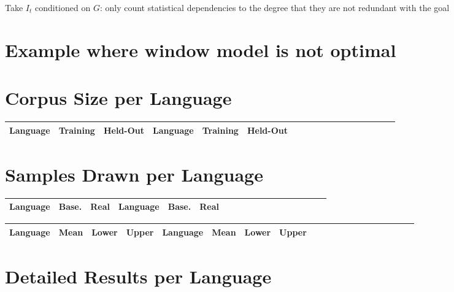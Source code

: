 \documentclass[11pt,letterpaper]{article}
\begin{document}
Take $I_t$ conditioned on $G$: only count statistical dependencies to the degree that they are not redundant with the goal


\section{Example where window model is not optimal}



\section{Corpus Size per Language}

\begin{center}
\begin{longtable}{l|ll||l|llllllllllllll}
	Language & Training & Held-Out & 	Language & Training & Held-Out\\ \hline

\end{longtable}
	\label{tab:corpora}
\end{center}

\section{Samples Drawn per Language}

\begin{center}
\begin{longtable}{l|ll||l|llllllllllllll}
	Language & Base. & Real & Language & Base. & Real \\ \hline

\end{longtable}
	\label{tab:samples}
\end{center}



\begin{center}
\begin{longtable}{l|lll||l|lllllllllllllll}
	Language & Mean & Lower & Upper & Language & Mean & Lower & Upper \\ \hline

\end{longtable}
	\label{tab:boot-g}
\end{center}


\section{Detailed Results per Language}
\end{document}
